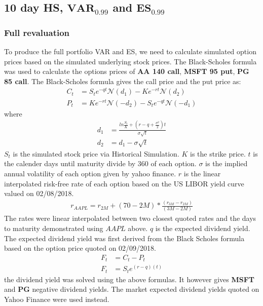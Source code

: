 \documentclass[a4paper,11pt]{article}
\begin{document}
\begin{flushleft}
\begin{itemize}
\subsection*{10 day HS, $\mathbf{VAR_{0.99}}$ and $\mathbf{ES_{0.99}}$}
\subsubsection*{Full revaluation}
To produce the full portfolio VAR and ES, we need to calculate simulated option prices based on the simulated underlying stock prices. The Black-Scholes formula was used to calculate the options prices of \textbf{AA 140 call}, \textbf{MSFT 95 put}, \textbf{PG 85 call}. The Black-Scholes formula gives the call price and the put price as:
\begin{align*}
C_t & = S_te^{-qt}\mathcal{N}\left(d_1\right) - K e^{-rt}\mathcal{N}\left(d_2\right) \\
P_t &=  K e^{-rt} \mathcal{N} \left(-d_2\right) - S_te^{-qt}\mathcal{N}\left(-d_1\right) 
\end{align*}
where
\begin{align*}
d_1 &= \frac{ln\frac{S_t}{K} + \left(r -q +  \frac{\sigma^2}{2}\right)t}{\sigma \sqrt{t}}\\
d_2 &= d_1 - \sigma \sqrt{t}
\end{align*}
$S_t$ is the simulated stock price via Historical Simulation. 
$K$ is the strike price.
$t$ is the calender days until maturity divide by 360 of each option.
$\sigma$ is the implied annual volatility of each option given by yahoo finance. $r$ is the linear interpolated risk-free rate of each option based on the US LIBOR yield curve valued on 02/08/2018. 
\begin{align*}
r_{AAPL} = r_{2M} + (70 - 2M) * \frac{(r_{3M} - r_{2M})} { (3M - 2M)}
\end{align*}
The rates were linear interpolated between two closest quoted rates and the days to maturity demonstrated using $AAPL$ above. $q$ is the expected dividend yield. The expected  dividend yield was first derived from the Black Scholes formula based on the option price quoted on 02/09/2018. 
\begin{align*}
F_t &=C_t - P_t\\
F_t&= S_t e^{\left(r - q\right)\left(t\right)}
\end{align*}
the dividend yield was solved using the above formulas. It however gives \textbf{MSFT} and \textbf{PG} negative dividend yields. The market expected dividend yields quoted on Yahoo Finance were used instead. 

\end{itemize}
\end{flushleft}
\end{document}
